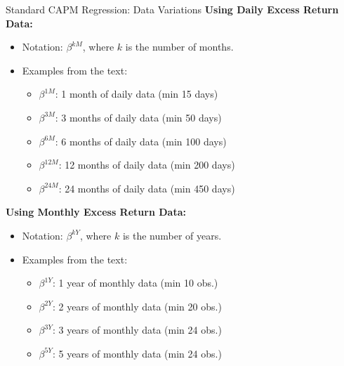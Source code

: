 \documentclass[10pt]{beamer}
\begin{document}
\begin{frame}{Standard CAPM Regression: Data Variations}
  \textbf{Using Daily Excess Return Data:}
  \begin{itemize}
    \item Notation: $\beta^{kM}$, where $k$ is the number of months.
    \item Examples from the text:
    \begin{itemize}
        \item $\beta^{1M}$: 1 month of daily data (min 15 days)
        \item $\beta^{3M}$: 3 months of daily data (min 50 days)
        \item $\beta^{6M}$: 6 months of daily data (min 100 days)
        \item $\beta^{12M}$: 12 months of daily data (min 200 days)
        \item $\beta^{24M}$: 24 months of daily data (min 450 days)
    \end{itemize}
  \end{itemize}

  \textbf{Using Monthly Excess Return Data:}
  \begin{itemize}
    \item Notation: $\beta^{kY}$, where $k$ is the number of years.
    \item Examples from the text:
    \begin{itemize}
        \item $\beta^{1Y}$: 1 year of monthly data (min 10 obs.)
        \item $\beta^{2Y}$: 2 years of monthly data (min 20 obs.)
        \item $\beta^{3Y}$: 3 years of monthly data (min 24 obs.)
        \item $\beta^{5Y}$: 5 years of monthly data (min 24 obs.)
    \end{itemize}
  \end{itemize}
\end{frame}
\end{document}
